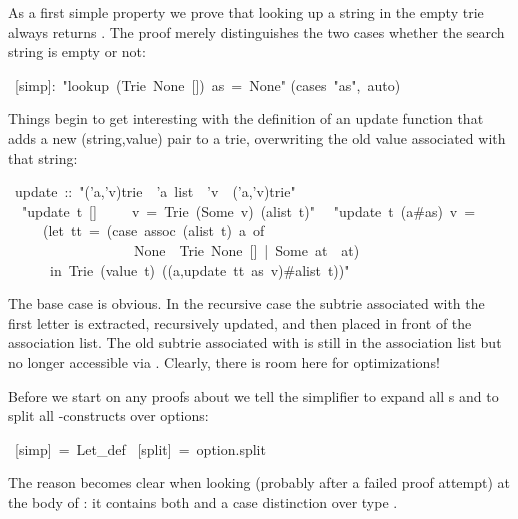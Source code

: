 \begin{isabelle}
\begin{isamarkuptext}
As a first simple property we prove that looking up a string in the empty
trie  always returns . The proof merely
distinguishes the two cases whether the search string is empty or not:%
\end{isamarkuptext}%
~[simp]:~{"}lookup~(Trie~None~[])~as~=~None{"}\isanewline
{}(cases~{"}as{"},~auto)%
\begin{isamarkuptext}%
Things begin to get interesting with the definition of an update function
that adds a new (string,value) pair to a trie, overwriting the old value
associated with that string:%
\end{isamarkuptext}%
~update~::~{"}('a,'v)trie~{\isasymRightarrow}~'a~list~{\isasymRightarrow}~'v~{\isasymRightarrow}~('a,'v)trie{"}\isanewline
{}\isanewline
~~{"}update~t~[]~~~~~v~=~Trie~(Some~v)~(alist~t){"}\isanewline
~~{"}update~t~(a\#as)~v~=\isanewline
~~~~~(let~tt~=~(case~assoc~(alist~t)~a~of\isanewline
~~~~~~~~~~~~~~~~~~None~{\isasymRightarrow}~Trie~None~[]~|~Some~at~{\isasymRightarrow}~at)\isanewline
~~~~~~in~Trie~(value~t)~((a,update~tt~as~v)\#alist~t)){"}%
\begin{isamarkuptext}%
\noindent
The base case is obvious. In the recursive case the subtrie
 associated with the first letter  is extracted,
recursively updated, and then placed in front of the association list.
The old subtrie associated with  is still in the association list
but no longer accessible via . Clearly, there is room here for
optimizations!

Before we start on any proofs about  we tell the simplifier to
expand all s and to split all -constructs over
options:%
\end{isamarkuptext}%
~[simp]~=~Let\_def\isanewline
{}~[split]~=~option.split%
\begin{isamarkuptext}%
\noindent
The reason becomes clear when looking (probably after a failed proof
attempt) at the body of : it contains both
 and a case distinction over type .


\end{isamarkuptext}
\end{isabelle}
